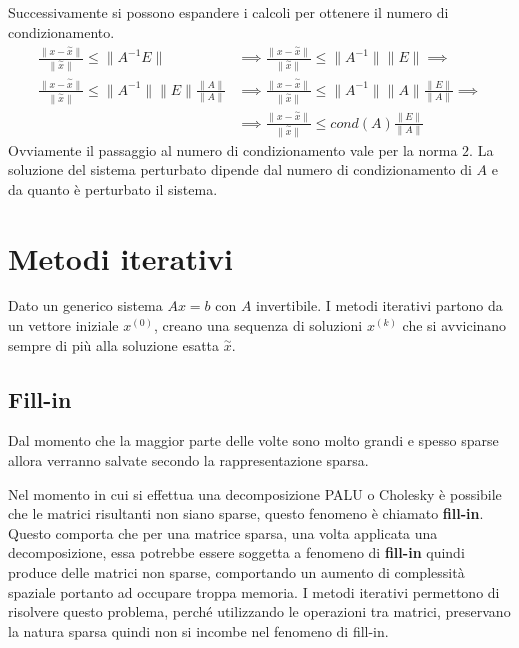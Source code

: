 Successivamente si possono espandere i calcoli per ottenere il numero di condizionamento.
\begin{equation*}
    \begin{aligned}
        \frac{\|x - \stackrel{\sim}{x}\|}{\|\stackrel{\sim}{x}\|} \leq \|A^{-1}E\|
         & \implies \frac{\|x - \stackrel{\sim}{x}\|}{\|\stackrel{\sim}{x}\|} \leq \|A^{-1}\|\|E\| \implies \\
        \frac{\|x - \stackrel{\sim}{x}\|}{\|\stackrel{\sim}{x}\|} \leq \|A^{-1}\|\|E\|\frac{\|A\|}{\|A\|} 
        & \implies \frac{\|x - \stackrel{\sim}{x}\|}{\|\stackrel{\sim}{x}\|} \leq \|A^{-1}\|\|A\|\frac{\|E\|}{\|A\|} \implies \\
        & \implies \frac{\|x - \stackrel{\sim}{x}\|}{\|\stackrel{\sim}{x}\|} \leq cond(A)\frac{\|E\|}{\|A\|}
    \end{aligned}
\end{equation*}
Ovviamente il passaggio al numero di condizionamento vale per la norma $2$. La
soluzione del sistema perturbato dipende dal numero di condizionamento di $A$ e
da quanto è perturbato il sistema.
\section{Metodi iterativi}
Dato un generico sistema $Ax=b$ con $A$ invertibile.
I metodi iterativi partono da un vettore iniziale $x^{(0)}$, creano una sequenza
di soluzioni $x^{(k)}$ che si avvicinano sempre di più alla soluzione esatta
$\stackrel{\sim}{x}$.

\subsection{Fill-in}
Dal momento che la maggior parte delle volte sono molto grandi e spesso sparse
allora verranno salvate secondo la rappresentazione sparsa.

Nel momento in cui si effettua una decomposizione PALU o Cholesky è possibile che
le matrici risultanti non siano sparse, questo fenomeno è chiamato \textbf{fill-in}.
Questo comporta che per una matrice sparsa, una volta applicata una decomposizione,
essa potrebbe essere soggetta a fenomeno di \textbf{fill-in} quindi produce
delle matrici non sparse, comportando un aumento di complessità spaziale portanto
ad occupare troppa memoria. I metodi iterativi permettono di risolvere questo problema,
perché utilizzando le operazioni tra matrici, preservano la natura sparsa quindi
non si incombe nel fenomeno di fill-in.

